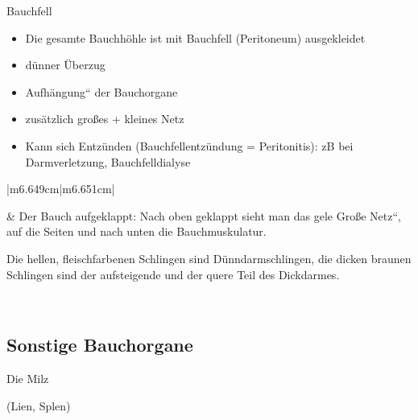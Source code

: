 \documentclass{article}
\begin{document}
Bauchfell

\begin{itemize}
\item Die gesamte Bauchh\"ohle ist mit  Bauchfell
(Peritoneum) ausgekleidet

\item d\"unner \"Uberzug

\item {\quotedblbase}Aufh\"angung{\textquotedblleft} der Bauchorgane 

\item zus\"atzlich gro{\ss}es + kleines Netz

\item Kann sich Entz\"unden (Bauchfellentz\"undung = Peritonitis): zB
bei Darmverletzung, Bauchfelldialyse 

\end{itemize}
\begin{center}
\tablehead{}\begin{supertabular}{|m{6.649cm}|m{6.651cm}|}
\hline
{}%
 \par

 &
Der Bauch {\quotedblbase}aufgeklappt: Nach oben geklappt sieht man das
gele {\quotedblbase}Gro{\ss}e Netz{\textquotedblleft}, auf die Seiten
und nach unten die Bauchmuskulatur. 

Die hellen, fleischfarbenen Schlingen sind D\"unndarmschlingen, die
dicken braunen Schlingen sind der aufsteigende und der quere Teil des
Dickdarmes.

\\\hline
\end{supertabular}
\end{center}
\subsection{Sonstige Bauchorgane}
Die Milz 

(Lien, Splen)
\end{document}
